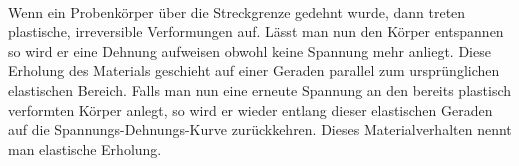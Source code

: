 \documentclass[11pt,a4paper]{article}
\numberwithin{equation}{section}
\numberwithin{figure}{section}
\begin{document}
\\
\begin{addmargin}[25pt]{0pt}
Wenn ein Probenkörper über die Streckgrenze gedehnt wurde, dann treten plastische, irreversible Verformungen auf. Lässt man nun den Körper entspannen so wird er eine Dehnung aufweisen obwohl keine Spannung mehr anliegt. Diese Erholung des Materials geschieht auf einer Geraden parallel zum ursprünglichen elastischen Bereich. Falls man nun eine erneute Spannung an den bereits plastisch verformten Körper anlegt, so wird er wieder entlang dieser elastischen Geraden auf die Spannungs-Dehnungs-Kurve zurückkehren. Dieses Materialverhalten nennt man elastische Erholung.\\
\end{addmargin}
\end{document}
